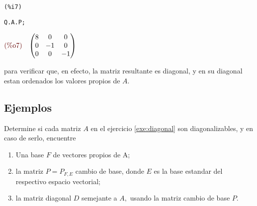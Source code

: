 \begin{solucion}
\noindent
\begin{minipage}{8ex}{\color{red}\bf
\begin{verbatim}
(%i7)
\end{verbatim}}
\end{minipage}
\begin{minipage}{\textwidth}{\color{blue}
\begin{verbatim}
Q.A.P;
\end{verbatim}}
\end{minipage}
\begin{math}\displaystyle
\parbox{8ex}{\color{labelcolor}(\%o7) }
\begin{pmatrix}8 & 0 & 0\cr 0 & -1 & 0\cr 0 & 0 & -1\end{pmatrix}
\end{math}

para verificar que, en efecto, la matriz resultante es diagonal, y en su diagonal estan ordenados los valores propios
de $A.$
\end{solucion}

\subsection*{Ejemplos}

\begin{resuelto}
 Determine si cada matriz $A$ en el ejercicio  \ref{exe:diagonal} son diagonalizables, y en caso de serlo, encuentre
 \begin{enumerate}
  \item Una base $F$ de vectores propios de A;
  \item la matriz $P=P_{F,E}$ cambio de base, donde  $E$ es la base estandar del respectivo espacio vectorial;
  \item la matriz diagonal $D$ semejante a $A,$ usando la matriz cambio de base $P.$
 \end{enumerate}

\end{resuelto}


